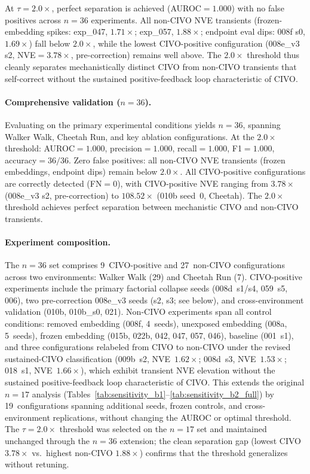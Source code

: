 At $\tau{=}2.0\times$, perfect separation is achieved (AUROC${=}1.000$) with no false positives across $n{=}36$ experiments. All non-CIVO NVE transients (frozen-embedding spikes: exp\_047, $1.71\times$; exp\_057, $1.88\times$; endpoint eval dips: 008f s0, $1.69\times$) fall below $2.0\times$, while the lowest CIVO-positive configuration (008e\_v3 s2, NVE${=}3.78\times$, pre-correction) remains well above. The $2.0\times$ threshold thus cleanly separates mechanistically distinct CIVO from non-CIVO transients that self-correct without the sustained positive-feedback loop characteristic of CIVO.

\paragraph{Comprehensive validation ($n{=}36$).}
Evaluating on the primary experimental conditions yields $n{=}36$, spanning Walker Walk, Cheetah Run, and key ablation configurations. At the $2.0\times$ threshold: AUROC${=}1.000$, precision${=}1.000$, recall${=}1.000$, F1${=}1.000$, accuracy${=}36/36$. Zero false positives: all non-CIVO NVE transients (frozen embeddings, endpoint dips) remain below $2.0\times$. All CIVO-positive configurations are correctly detected (FN${=}0$), with CIVO-positive NVE ranging from $3.78\times$ (008e\_v3 s2, pre-correction) to $108.52\times$ (010b seed~0, Cheetah). The $2.0\times$ threshold achieves perfect separation between mechanistic CIVO and non-CIVO transients.

\paragraph{Experiment composition.}
The $n{=}36$ set comprises 9~CIVO-positive and 27~non-CIVO configurations across two environments: Walker Walk (29) and Cheetah Run (7). CIVO-positive experiments include the primary factorial collapse seeds (008d~s1/s4, 059~s5, 006), two pre-correction 008e\_v3 seeds (s2, s3; see below), and cross-environment validation (010b, 010b\_s0, 021). Non-CIVO experiments span all control conditions: removed embedding (008f, 4~seeds), unexposed embedding (008a, 5~seeds), frozen embedding (015b, 022b, 042, 047, 057, 046), baseline (001~s1), and three configurations relabeled from CIVO to non-CIVO under the revised sustained-CIVO classification (009b~s2, NVE~$1.62\times$; 008d~s3, NVE~$1.53\times$; 018~s1, NVE~$1.66\times$), which exhibit transient NVE elevation without the sustained positive-feedback loop characteristic of CIVO. This extends the original $n{=}17$ analysis (Tables~\ref{tab:sensitivity_b1}--\ref{tab:sensitivity_b2_full}) by 19~configurations spanning additional seeds, frozen controls, and cross-environment replications, without changing the AUROC or optimal threshold. The $\tau{=}2.0\times$ threshold was selected on the $n{=}17$ set and maintained unchanged through the $n{=}36$ extension; the clean separation gap (lowest CIVO $3.78\times$ vs.\ highest non-CIVO $1.88\times$) confirms that the threshold generalizes without retuning.

